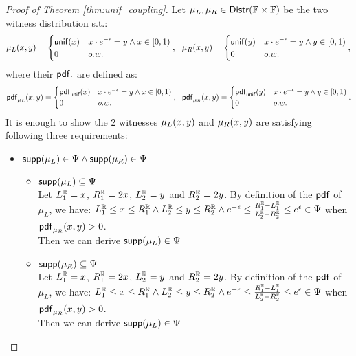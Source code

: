 \documentclass[a4paper,11pt]{article}
\begin{document}
\begin{proof}[Proof of Theorem \ref{thm:unif_coupling}]
%
%
Let $\mu_L, \mu_R \in \mathsf{Distr}(\mathbb{F} \times \mathbb{F})$ be the two witness distribution s.t.:
\[
	{\mu_L}(x, y) = 
	\begin{cases}
	{\mathsf{unif}}(x) & x \cdot e^{-\epsilon} = y \land x \in [0, 1)\\
	0       & o.w.
	\end{cases},
	~~
	{\mu_R}(x, y) = 
	\begin{cases}
	{\mathsf{unif}}(y) & x \cdot e^{-\epsilon} = y \land y \in [0, 1)\\
	0       & o.w.
	\end{cases},
\]
%
%
where their $\mathsf{pdf}.$ are defined as:
\[
	\mathsf{pdf}_{\mu_L}(x, y) = 
	\begin{cases}
	\mathsf{pdf}_{\mathsf{unif}}(x) & x \cdot e^{-\epsilon} = y \land x \in [0, 1)\\
	0       & o.w.
	\end{cases},
~~
	\mathsf{pdf}_{\mu_R}(x, y) = 
	\begin{cases}
	\mathsf{pdf}_{\mathsf{unif}}(y) & x \cdot e^{-\epsilon} = y \land y \in [0, 1)\\
	0       & o.w.
	\end{cases}.
\]
It is enough to show the 2 witnesses $\mu_L(x, y)$ and $\mu_R(x, y)$ are satisfying following three requirements:
\begin{itemize}
	\item $\mathsf{supp}(\mu_L) \in \Psi \land \mathsf{supp}(\mu_R) \in \Psi$

	\begin{itemize}
		\item $\mathsf{supp}(\mu_L) \subseteq \Psi$ 
		\\
		Let $L^{\mathbb{R}}_1 = x$, $R^{\mathbb{R}}_1 = 2x$, $L^{\mathbb{R}}_2 = y$ and $R^{\mathbb{R}}_2 = 2y$. 
		By definition of the $\mathsf{pdf}$ of $\mu_L$, we have: 
		$L^{\mathbb{R}}_1 \leq x \leq R^{\mathbb{R}}_1 
		\land L^{\mathbb{R}}_2 \leq y \leq R^{\mathbb{R}}_2
		\land e^{-\epsilon} \leq 
		\frac{R^{\mathbb{R}}_1 - L^{\mathbb{R}}_1}{L^{\mathbb{R}}_2 - R^{\mathbb{R}}_2}
		\leq e^{\epsilon} \in \Psi$ when $\mathsf{pdf}_{\mu_R}(x, y) > 0$.
		\\%
		Then we can derive $\mathsf{supp}(\mu_L) \in \Psi$
		\\
		\item $\mathsf{supp}(\mu_R) \subseteq \Psi$
		\\
		Let $L^{\mathbb{R}}_1 = x$, $R^{\mathbb{R}}_1 = 2x$, $L^{\mathbb{R}}_2 = y$ and $R^{\mathbb{R}}_2 = 2y$. 
		By definition of the $\mathsf{pdf}$ of $\mu_L$, we have: 
		$L^{\mathbb{R}}_1 \leq x \leq R^{\mathbb{R}}_1 
		\land L^{\mathbb{R}}_2 \leq y \leq R^{\mathbb{R}}_2
		\land e^{-\epsilon} \leq 
		\frac{R^{\mathbb{R}}_1 - L^{\mathbb{R}}_1}{L^{\mathbb{R}}_2 - R^{\mathbb{R}}_2}
		\leq e^{\epsilon} \in \Psi$ when $\mathsf{pdf}_{\mu_R}(x, y) > 0$.
		\\
		Then we can derive $\mathsf{supp}(\mu_L) \in \Psi$
	\end{itemize}		



\end{itemize}
\end{proof}
\end{document}
